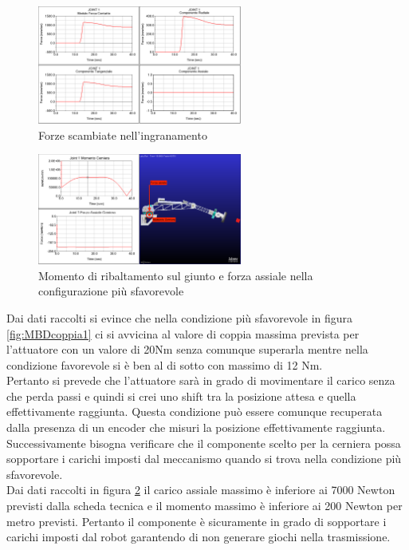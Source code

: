 \documentclass[%
corpo=11pt,
twoside,
 stile=classica,
oldstyle,
greek,%
]{toptesi}
\begin{document}
	\begin{figure} [!ht]
		\centering
		\includegraphics[width=0.6\textwidth]{Plots/BASE/joint1_forze.png}
		\caption{Forze scambiate nell'ingranamento}
		\label{fig:MBDforze1}
	\end{figure}
	\begin{figure}[!ht]
		\centering
		\includegraphics[width=0.6\textwidth]{Plots/BASE/joint1_ralla.png}
		\caption{Momento di ribaltamento sul giunto e forza assiale nella configurazione più sfavorevole}
		\label{fig:MBDralla1}
	\end{figure}
	
			Dai dati raccolti si evince che nella condizione più sfavorevole in figura \ref{fig:MBDcoppia1}  ci si avvicina al valore di coppia massima prevista per l'attuatore con un valore di 20Nm senza comunque superarla mentre nella condizione favorevole si è ben al di sotto con massimo di 12 Nm. \\
			Pertanto si prevede che l'attuatore sarà in grado di movimentare il carico senza che perda passi e quindi si crei uno shift tra la posizione attesa e quella effettivamente raggiunta. Questa condizione può essere comunque recuperata dalla presenza di un encoder che misuri la posizione effettivamente raggiunta. \\
			
			Successivamente bisogna verificare che il componente scelto per la cerniera possa sopportare i carichi imposti dal meccanismo quando si trova nella condizione più sfavorevole.\\
			Dai dati raccolti in figura \ref{fig:MBDralla1} il carico assiale massimo è inferiore ai 7000 Newton previsti dalla scheda tecnica e il momento massimo è inferiore ai 200 Newton per metro previsti. Pertanto il componente è sicuramente in grado di sopportare i carichi imposti dal robot garantendo di non generare giochi nella trasmissione. \\
			
\end{document}
